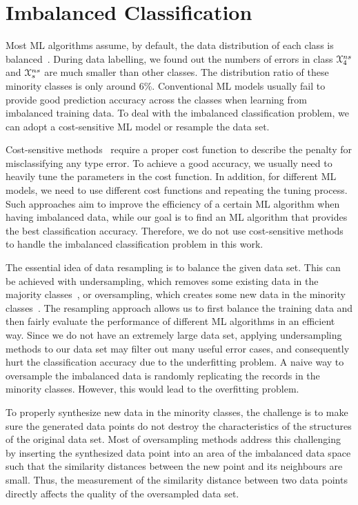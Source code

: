 \documentclass[12pt]{report}	%
\begin{document}
\section{Imbalanced Classification}
\label{sec:ml:smote-cv}

Most ML algorithms assume, by default, the data distribution of each class is balanced~\cite{he2009learning}.
During data labelling,
we found out the numbers of errors
in class $\mathcal{X}^{ns}_{4}$ and
$\mathcal{X}^{ns}_{s}$ are much smaller than other classes.
The distribution ratio of these minority classes is only around 6\%.
Conventional ML models usually fail to provide good prediction accuracy
across the classes when learning from imbalanced training data.
To deal with the imbalanced classification problem,
we can adopt a cost-sensitive
ML model or resample the data set.

Cost-sensitive methods~\cite{elkan2001foundations,ting2002instance} require a proper cost function
to describe the penalty for misclassifying any type error.
To achieve a good accuracy, we usually need to heavily tune the parameters
in the cost function. In addition, for different ML models, we need to use different
cost functions and repeating the tuning process.
Such approaches aim to improve the efficiency of a certain
ML algorithm when having imbalanced data,
while our goal is to find an ML algorithm that provides the best classification accuracy.
Therefore, we do not use cost-sensitive methods to handle
the imbalanced classification problem in this work.

The essential idea of data resampling is to balance the 
given data set. This can be achieved with 
undersampling, which 
removes some existing data in the majority classes~\cite{liu2009exploratory},
or oversampling, 
which creates some new data in the minority classes~\cite{Chawla:2002:SSM:1622407.1622416,wang2004imbalanced,jo2004class}.
The resampling approach allows us to first
balance the training data and then
fairly evaluate the performance of different ML algorithms
in an efficient way.
Since we do not have an extremely large data set, applying undersampling
methods to our data set may filter out many useful error cases,
and consequently hurt the classification accuracy due to 
the underfitting problem.
A naive way to oversample the imbalanced data
is randomly replicating the records in the minority classes.
However, this would lead to the overfitting problem.

To properly synthesize new data in the minority classes,
the challenge is to make sure the generated data points
do not destroy the characteristics of the structures
of the original data set. Most of oversampling
methods address this challenging by inserting 
the synthesized
data point into an area of the imbalanced
data space such that the similarity distances
between the new point and its neighbours are
small. Thus, the measurement of 
the similarity distance
between two data points directly affects
the quality of the oversampled data set.
\end{document}
